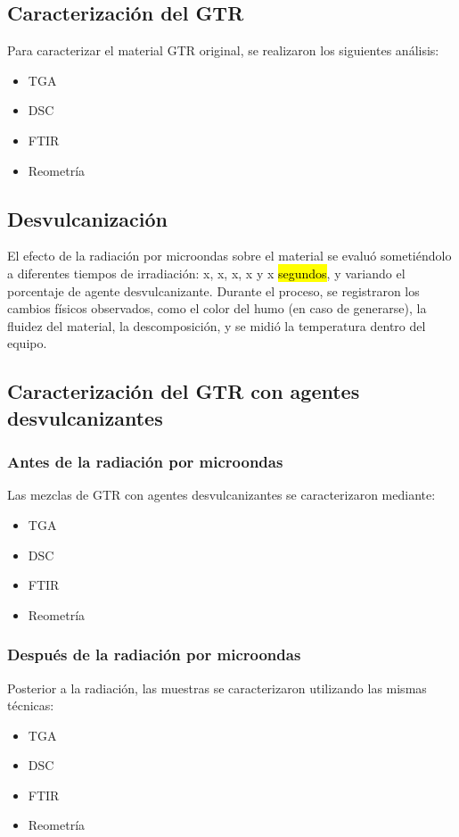 \begin{multicols}{2}

\subsection{Caracterización del GTR}

Para caracterizar el material GTR original, se realizaron los siguientes análisis:  
\begin{itemize}
    \item TGA  
    \item DSC  
    \item FTIR  
    \item Reometría  
\end{itemize}

\subsection{Desvulcanización}

El efecto de la radiación por microondas sobre el material se evaluó sometiéndolo a diferentes tiempos de irradiación: x, x, x, x y x \hl{segundos}, y variando el porcentaje de agente desvulcanizante. Durante el proceso, se registraron los cambios físicos observados, como el color del humo (en caso de generarse), la fluidez del material, la descomposición, y se midió la temperatura dentro del equipo. %

\subsection{Caracterización del GTR con agentes desvulcanizantes}

\subsubsection{Antes de la radiación por microondas}

Las mezclas de GTR con agentes desvulcanizantes se caracterizaron mediante:  
\begin{itemize}
    \item TGA  
    \item DSC  
    \item FTIR  
    \item Reometría  
\end{itemize}

\subsubsection{Después de la radiación por microondas}

Posterior a la radiación, las muestras se caracterizaron utilizando las mismas técnicas:  
\begin{itemize}
    \item TGA  
    \item DSC  
    \item FTIR  
    \item Reometría  
\end{itemize}

\end{multicols}

